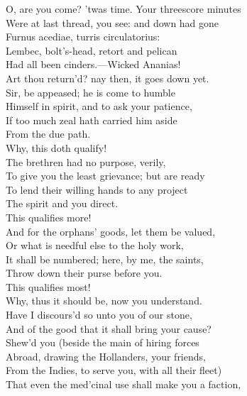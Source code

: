 \documentclass[a4paper,oneside]{memoir}
\begin{document}
\begin{drama*}
\subtlespeaks {} O, are you come? 'twas time. Your threescore minutes\\
Were at last thread, you see: and down had gone\\
Furnus acediae, turris circulatorius:\\
Lembec, bolt's-head, retort and pelican\\
Had all been cinders.---Wicked Ananias!\\
Art thou return'd? nay then, it goes down yet.\\
\tribulationspeaks Sir, be appeased; he is come to humble\\
Himself in spirit, and to ask your patience,\\
If too much zeal hath carried him aside\\
From the due path.\\
\subtlespeaks {} Why, this doth qualify!\\
\tribulationspeaks The brethren had no purpose, verily,\\
To give you the least grievance; but are ready\\
To lend their willing hands to any project\\
The spirit and you direct.\\
\subtlespeaks {} This qualifies more!\\
\tribulationspeaks And for the orphans' goods, let them be valued,\\
Or what is needful else to the holy work,\\
It shall be numbered; here, by me, the saints,\\
Throw down their purse before you.\\
\subtlespeaks {} This qualifies most!\\
Why, thus it should be, now you understand.\\
Have I discours'd so unto you of our stone,\\
And of the good that it shall bring your cause?\\
Shew'd you (beside the main of hiring forces\\
Abroad, drawing the Hollanders, your friends,\\
From the Indies, to serve you, with all their fleet)\\
That even the med'cinal use shall make you a faction,\\

\end{drama*}
\end{document}
